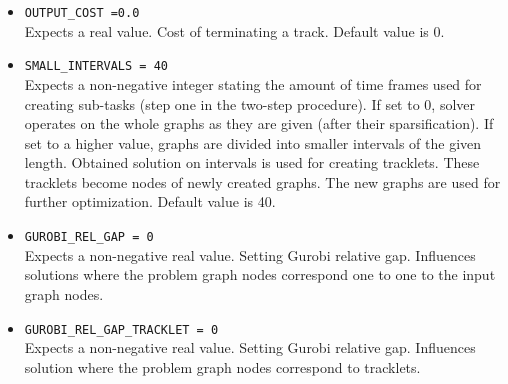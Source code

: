 \documentclass[a4paper,10pt]{article}
\begin{document}
\begin{itemize}
 \item  \texttt{OUTPUT\_COST =0.0} \\
Expects a real value. Cost of terminating a track. Default value is 0. 

 \item  \texttt{SMALL\_INTERVALS = 40}\\
 Expects a non-negative integer stating the amount of time frames used for creating sub-tasks (step one in the two-step procedure). If set to $0$, solver operates on the whole graphs as they are given (after their sparsification). If set to a higher value, graphs are divided into smaller intervals of the given length. Obtained solution on intervals is used for creating tracklets. These tracklets become nodes of newly created graphs. The new graphs are used for further optimization. Default value is 40.

%   
 \item  \texttt{GUROBI\_REL\_GAP = 0} \\
 Expects a non-negative real value. Setting Gurobi relative gap. Influences solutions where the problem graph nodes correspond one to one to the input graph nodes.
 
 \item  \texttt{GUROBI\_REL\_GAP\_TRACKLET = 0}\\
Expects a non-negative real value. Setting Gurobi relative gap. Influences solution where the problem graph nodes correspond to tracklets.
 \end{itemize}
 
\end{document}

